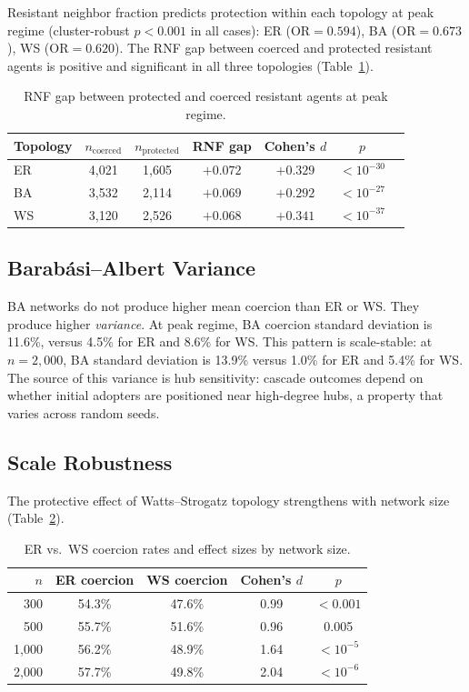 \documentclass[11pt, a4paper]{article}
\newcommand{\OR}{\text{OR}}
\begin{document}
Resistant neighbor fraction predicts protection within each topology at peak regime (cluster-robust $p < 0.001$ in all cases): ER ($\OR = 0.594$), BA ($\OR = 0.673$), WS ($\OR = 0.620$). The RNF gap between coerced and protected resistant agents is positive and significant in all three topologies (Table~\ref{tab:rnf_gap}).

\begin{table}[H]
\centering
\caption{RNF gap between protected and coerced resistant agents at peak regime.}
\label{tab:rnf_gap}
\begin{tabular}{lcccccc}
\toprule
\textbf{Topology} & $n_{\text{coerced}}$ & $n_{\text{protected}}$ & \textbf{RNF gap} & \textbf{Cohen's} $d$ & $p$ \\
\midrule
ER & 4{,}021 & 1{,}605 & $+0.072$ & $+0.329$ & $< 10^{-30}$ \\
BA & 3{,}532 & 2{,}114 & $+0.069$ & $+0.292$ & $< 10^{-27}$ \\
WS & 3{,}120 & 2{,}526 & $+0.068$ & $+0.341$ & $< 10^{-37}$ \\
\bottomrule
\end{tabular}
\end{table}

\subsection{Barab\'{a}si--Albert Variance}

BA networks do not produce higher mean coercion than ER or WS. They produce higher \textit{variance}. At peak regime, BA coercion standard deviation is 11.6\%, versus 4.5\% for ER and 8.6\% for WS. This pattern is scale-stable: at $n = 2{,}000$, BA standard deviation is 13.9\% versus 1.0\% for ER and 5.4\% for WS. The source of this variance is hub sensitivity: cascade outcomes depend on whether initial adopters are positioned near high-degree hubs, a property that varies across random seeds.

\subsection{Scale Robustness}

The protective effect of Watts--Strogatz topology strengthens with network size (Table~\ref{tab:scale}).

\begin{table}[H]
\centering
\caption{ER vs.\ WS coercion rates and effect sizes by network size.}
\label{tab:scale}
\begin{tabular}{rcccc}
\toprule
$n$ & \textbf{ER coercion} & \textbf{WS coercion} & \textbf{Cohen's} $d$ & $p$ \\
\midrule
300 & 54.3\% & 47.6\% & 0.99 & $< 0.001$ \\
500 & 55.7\% & 51.6\% & 0.96 & 0.005 \\
1{,}000 & 56.2\% & 48.9\% & 1.64 & $< 10^{-5}$ \\
2{,}000 & 57.7\% & 49.8\% & 2.04 & $< 10^{-6}$ \\
\bottomrule
\end{tabular}
\end{table}
\end{document}
